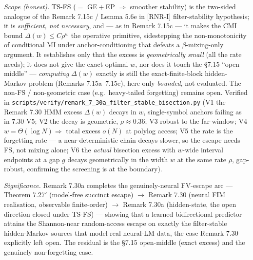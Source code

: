 \documentclass[
]{article}
\begin{document}
\emph{Scope (honest).} TS-FS ($=$ GE${}+{}$EP $\Rightarrow$ smoother stability) is the
two-sided analogue of the Remark 7.15c / Lemma 5.6e in [RNR-I] filter-stability hypothesis;
it is \emph{sufficient, not necessary}, and --- as in Remark 7.15c --- it makes the CMI
bound $\Delta(w)\le C\rho^w$ the operative primitive, sidestepping the non-monotonicity
of conditional MI under anchor-conditioning that defeats a $\beta$-mixing-only argument.
It establishes only that the excess is \emph{geometrically small} (all the rate needs);
it does not give the exact optimal $w$, nor does it touch the §7.15 ``open middle'' ---
\emph{computing} $\Delta(w)$ exactly is still the exact-finite-block hidden-Markov
problem (Remarks 7.15a--7.15e), here only \emph{bounded}, not evaluated. The non-FS /
non-geometric case (e.g.\ heavy-tailed forgetting) remains open. Verified in
\texttt{scripts/verify/remark\_7\_30a\_filter\_stable\_bisection.py} (V1 the Remark 7.30
HMM excess $\Delta(w)$ decays in $w$, single-symbol anchors failing as in 7.30 V5; V2
the decay is geometric, $\rho\approx0.36$; V3 robust to the far-window; V4 $w=\Theta(\log
N)\Rightarrow$ total excess $o(N)$ at polylog access; V5 the rate is the forgetting rate
--- a near-deterministic chain decays slower, so the escape needs FS, not mixing alone;
V6 the \emph{actual} bisection excess with $w$-wide interval endpoints at a gap $g$ decays
geometrically in the width $w$ at the same rate $\rho$, gap-robust, confirming the
screening is at the boundary).

\emph{Significance.} Remark 7.30a completes the genuinely-neural FV-escape arc ---
Theorem 7.27$'$ (model-free succinct escape) $\to$ Remark 7.30 (neural FIM realisation,
observable finite-order) $\to$ Remark 7.30a (hidden-state, the open direction closed
under TS-FS) --- showing that a learned bidirectional predictor attains the Shannon-near
random-access escape on exactly the filter-stable hidden-Markov sources that model real
neural-LM data, the case Remark 7.30 explicitly left open. The residual is the §7.15
open-middle (exact excess) and the genuinely non-forgetting case.
\end{document}
